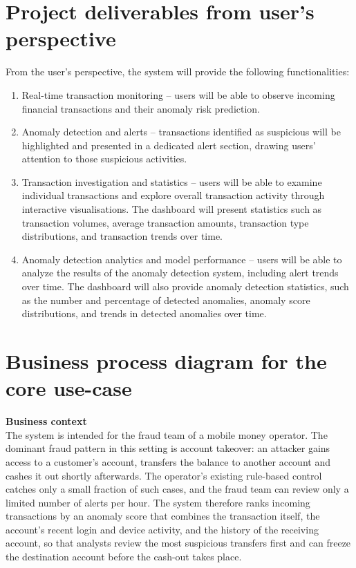 \documentclass[titlepage]{article}
\begin{document}
\section{Project deliverables from user's perspective}
From the user's perspective, the system will provide the following functionalities:
\begin{enumerate}
    \item Real-time transaction monitoring -- users will be able to observe incoming financial transactions and their anomaly risk prediction.
    \item Anomaly detection and alerts -- transactions identified as suspicious will be highlighted and presented in a dedicated alert section, drawing users' attention to those suspicious activities.
    \item Transaction investigation and statistics -- users will be able to examine individual transactions and explore overall transaction activity through interactive visualisations. The dashboard will present statistics such as transaction volumes, average transaction amounts, transaction type distributions, and transaction trends over time.
    \item Anomaly detection analytics and model performance -- users will be able to analyze the results of the anomaly detection system, including alert trends over time. The dashboard will also provide anomaly detection statistics, such as the number and percentage of detected anomalies, anomaly score distributions, and trends in detected anomalies over time.
\end{enumerate}


\section{Business process diagram for the core use-case}
\textbf{Business context}\\ 
The system is intended for the fraud team of a mobile money operator. The dominant fraud pattern in this setting is account takeover: an attacker gains access to a customer's account, transfers the balance to another account and cashes it out shortly afterwards. The operator's existing rule-based control catches only a small fraction of such cases, and the fraud team can review only a limited number of alerts per hour. The system therefore ranks incoming transactions by an anomaly score that combines the transaction itself, the account's recent login and device activity, and the history of the receiving account, so that analysts review the most suspicious transfers first and can freeze the destination account before the cash-out takes place.\\
\end{document}
